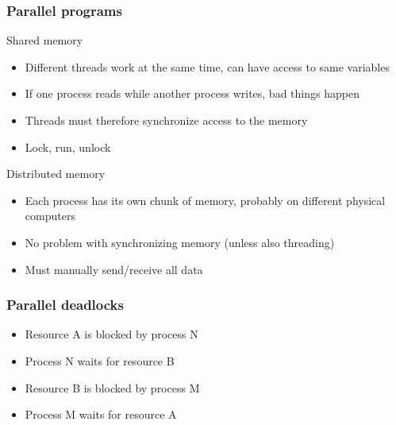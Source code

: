 \documentclass{beamer}
\begin{document}

\begin{frame}
  \frametitle{Parallel programs}
  \begin{block}{Shared memory}
    \begin{itemize}
    \item Different threads work at the same time, can have access to same variables
    \item If one process reads while another process writes, bad things happen
    \item Threads must therefore synchronize access to the memory
    \item Lock, run, unlock
    \end{itemize}
  \end{block}
  \begin{block}{Distributed memory}
    \begin{itemize}
    \item Each process has its own chunk of memory, probably on different physical computers
    \item No problem with synchronizing memory (unless also threading)
    \item Must manually send/receive all data
    \end{itemize}
  \end{block}
\end{frame}

\begin{frame}
  \frametitle{Parallel deadlocks}
  \begin{itemize}
  \item Resource A is blocked by process N
  \item Process N waits for resource B
  \item Resource B is blocked by process M
  \item Process M waits for resource A
  \end{itemize}
\end{frame}
\end{document}
